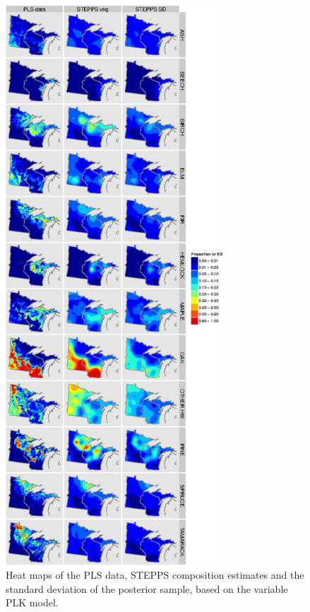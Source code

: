 \begin{figure}
\centering
\includegraphics[width=3.2in]{figures/maps_PLS_STEPPS_SD.png}
\caption[]{\internallinenumbers \doublespacing Heat maps of the PLS data, STEPPS
  composition estimates and the standard deviation of the posterior
  sample, based on the variable PLK model.}
\label{fig:maps_pls_stepps_sd}
\end{figure}




